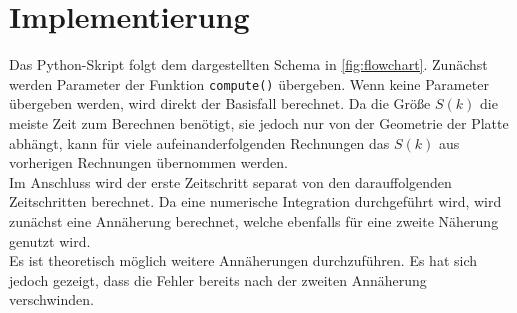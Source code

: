 \chapter[Implementierung (eigene Leistung)]{Implementierung}
\label{chap:Implementation}


Das Python-Skript folgt dem dargestellten Schema in \ref{fig:flowchart}. Zunächst werden Parameter der Funktion \texttt{compute()} übergeben. Wenn keine Parameter übergeben werden, wird direkt der Basisfall berechnet. Da die Größe $S(k)$ die meiste Zeit zum Berechnen benötigt, sie jedoch nur von der Geometrie der Platte abhängt, kann für viele aufeinanderfolgenden Rechnungen das $S(k)$ aus vorherigen Rechnungen übernommen werden.\\ 
Im Anschluss wird der erste Zeitschritt separat von den darauffolgenden Zeitschritten berechnet. Da eine numerische Integration durchgeführt wird, wird zunächst eine Annäherung berechnet, welche ebenfalls für eine zweite Näherung genutzt wird.\\
Es ist theoretisch möglich weitere Annäherungen durchzuführen. Es hat sich jedoch gezeigt, dass die Fehler bereits nach der zweiten Annäherung verschwinden.


